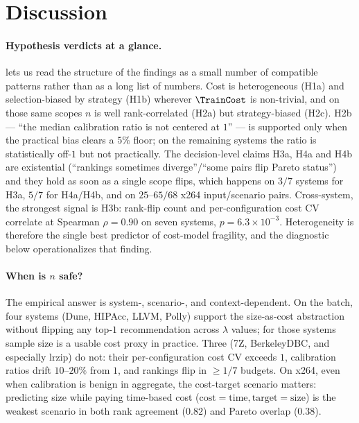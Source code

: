 \section{Discussion}
\label{sec:discussion}

\paragraph*{Hypothesis verdicts at a glance.}
 lets us read the structure of the
findings as a small number of compatible patterns rather than as a long
list of numbers. Cost is heterogeneous (H1a) and selection-biased by
strategy (H1b) wherever $\TrainCost$ is non-trivial, and on those same
scopes $n$ is well rank-correlated (H2a) but strategy-biased (H2c).
H2b --- ``the median calibration ratio is not centered at $1$'' --- is
supported only when the practical bias clears a $5\%$ floor; on the
remaining systems the ratio is statistically off-$1$ but not
practically. The decision-level claims H3a, H4a and H4b are existential
(``rankings sometimes diverge''/``some pairs flip Pareto status'')
and they hold as soon as a single scope flips, which happens on
$3/7$ \StudyReplication systems for H3a, $5/7$ for H4a/H4b, and on
$25$--$65/68$ x264 input/scenario pairs. Cross-system, the
strongest signal is H3b: rank-flip count and per-configuration cost CV
correlate at Spearman $\rho=0.90$ on seven systems, $p=6.3\!\times\!
10^{-3}$. Heterogeneity is therefore the single best predictor of
cost-model fragility, and the diagnostic below operationalizes that
finding.

\paragraph*{When is $n$ safe?}
The empirical answer is system-, scenario-, and context-dependent. On
the \StudyReplication batch, four systems (Dune, HIPAcc, LLVM, Polly) support the
size-as-cost abstraction without flipping any top-$1$ recommendation
across $\lambda$ values; for those systems sample size is a usable cost
proxy in practice. Three (7Z, BerkeleyDBC, and especially lrzip) do not:
their per-configuration cost CV exceeds $1$, calibration ratios drift
$10$--$20\%$ from $1$, and rankings flip in $\geq\!1/7$ budgets. On
x264, even when calibration is benign in aggregate, the
cost-target scenario matters: predicting size while paying time-based
cost ($\text{cost}=\text{time}, \text{target}=\text{size}$) is the
weakest scenario in both rank agreement ($0.82$) and Pareto overlap
($0.38$).

